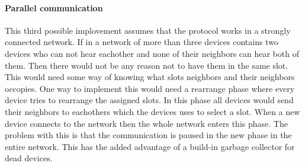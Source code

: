 \paragraph{Parallel communication}
This third possible implovement assumes that the protocol works in a strongly connected network. 
If in a network of more than three devices contains two devices who can not hear eachother and none of their neighbors can hear both of them. 
Then there would not be any reason not to have them in the same slot.
This would need some way of knowing what slots neighbors and their neighbors occopies.
One way to implement this would need a rearrange phase where every device tries to rearrange the assigned slots. 
In this phase all devices would send their neighbors to eachothers which the devices uses to select a slot.
When a new device connects to the network then the whole network enters this phase.
The problem with this is that the communication is paused in the new phase in the entire network.
This has the added advantage of a build-in garbage collector for dead devices.
